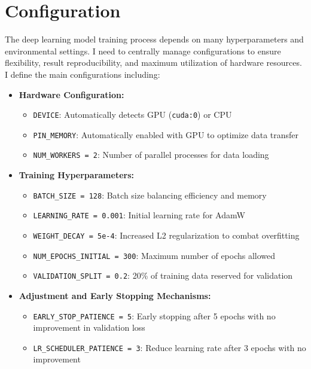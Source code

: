 \documentclass[12pt, a4paper, openany]{report}
\begin{document}
 \section{Configuration} %
 The deep learning model training process depends on many hyperparameters and environmental settings. I need to centrally manage configurations to ensure flexibility, result reproducibility, and maximum utilization of hardware resources. I define the main configurations including:
 \begin{itemize}
     \item \textbf{Hardware Configuration:} %
     \begin{itemize}
         \item \texttt{DEVICE}: Automatically detects GPU (\texttt{cuda:0}) or CPU %
         \item \texttt{PIN\_MEMORY}: Automatically enabled with GPU to optimize data transfer %
         \item \texttt{NUM\_WORKERS = 2}: Number of parallel processes for data loading %
     \end{itemize}
     \item \textbf{Training Hyperparameters:} %
     \begin{itemize}
         \item \texttt{BATCH\_SIZE = 128}: Batch size balancing efficiency and memory %
         \item \texttt{LEARNING\_RATE = 0.001}: Initial learning rate for AdamW %
         \item \texttt{WEIGHT\_DECAY = 5e-4}: Increased L2 regularization to combat overfitting %
         \item \texttt{NUM\_EPOCHS\_INITIAL = 300}: Maximum number of epochs allowed %
         \item \texttt{VALIDATION\_SPLIT = 0.2}: 20\% of training data reserved for validation %
     \end{itemize}
     \item \textbf{Adjustment and Early Stopping Mechanisms:} %
     \begin{itemize}
         \item \texttt{EARLY\_STOP\_PATIENCE = 5}: Early stopping after 5 epochs with no improvement in validation loss %
         \item \texttt{LR\_SCHEDULER\_PATIENCE = 3}: Reduce learning rate after 3 epochs with no improvement %

\end{itemize}
\end{itemize}
\end{document}
